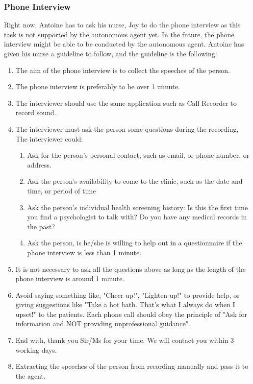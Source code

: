 \documentclass{article}
\begin{document}
	\subsubsection{Phone Interview}
	
Right now, Antoine has to ask his nurse, Joy to do the phone interview as this task is not supported by the autonomous agent yet. 
	In the future, the phone interview might be able to be conducted by the autonomous agent.
	Antoine has given his nurse a guideline to follow, and the guideline is the following:
	
    \begin{enumerate}
    		\item The aim of the phone interview is to collect the speeches of the person.
    		\item The phone interview is preferably to be over 1 minute.
		\item The interviewer should use the same application such as Call Recorder to record sound.
		\item The interviewer must ask the person some questions during the recording. The interviewer could: 
          \begin{enumerate}
          	\item Ask for the person's personal contact, such as email, or phone number, or address.
          	\item Ask the person's availability to come to the clinic, such as the date and time, or period of time
          	\item Ask the person's individual health screening history: 
          	Is this the first time you find a psychologist to talk with? Do you have any medical records in the past?
          	\item Ask the person, is he/she is willing to help out in a questionnaire if the phone interview is less than 1 minute.
          \end{enumerate}
        \item It is not necessary to ask all the questions above as long as the length of the phone interview is around 1 minute.
        \item Avoid saying something like, "Cheer up!", "Lighten up!" to provide help, or giving suggestions like 
        		"Take a hot bath. That's what I always do when I upset!" to the patients. 
        		Each phone call should obey the principle of "Ask for information and NOT providing unprofessional guidance". \cite{PCS16}
        \item End with, thank you Sir/Ms for your time. We will contact you within 3 working days.
        \item Extracting the speeches of the person from recording manually and pass it to the agent.
	\end{enumerate}
\end{document}
